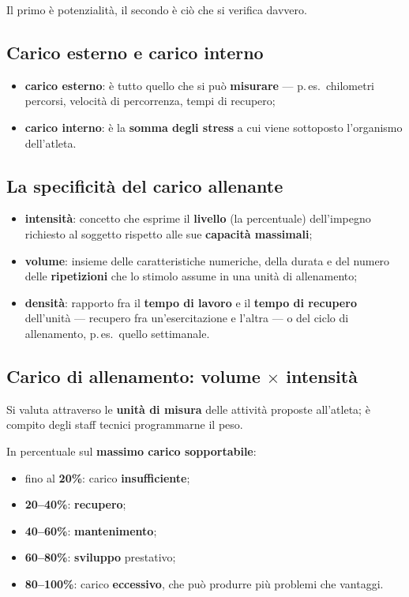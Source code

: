 Il primo è potenzialità, il secondo è ciò che si verifica davvero.

\subsection{Carico esterno e carico interno}

\begin{itemize}
  \item \textbf{carico esterno}: è tutto quello che si può \textbf{misurare} --- p.\,es.\ chilometri
    percorsi, velocità di percorrenza, tempi di recupero;
  \item \textbf{carico interno}: è la \textbf{somma degli stress} a cui viene sottoposto l'organismo
    dell'atleta.
\end{itemize}

\subsection{La specificità del carico allenante}

\begin{itemize}
  \item \textbf{intensità}: concetto che esprime il \textbf{livello} (la percentuale) dell'impegno
    richiesto al soggetto rispetto alle sue \textbf{capacità massimali};
  \item \textbf{volume}: insieme delle caratteristiche numeriche, della durata e del numero delle
    \textbf{ripetizioni} che lo stimolo assume in una unità di allenamento;
  \item \textbf{densità}: rapporto fra il \textbf{tempo di lavoro} e il \textbf{tempo di recupero}
    dell'unità --- recupero fra un'esercitazione e l'altra --- o del ciclo di allenamento, p.\,es.\
    quello settimanale.
\end{itemize}

\subsection{Carico di allenamento: volume $\times$ intensità}

Si valuta attraverso le \textbf{unità di misura} delle attività proposte all'atleta; è compito degli
staff tecnici programmarne il peso.

In percentuale sul \textbf{massimo carico sopportabile}:

\begin{itemize}
  \item fino al \textbf{20\%}: carico \textbf{insufficiente};
  \item \textbf{20--40\%}: \textbf{recupero};
  \item \textbf{40--60\%}: \textbf{mantenimento};
  \item \textbf{60--80\%}: \textbf{sviluppo} prestativo;
  \item \textbf{80--100\%}: carico \textbf{eccessivo}, che può produrre più problemi che vantaggi.
\end{itemize}

